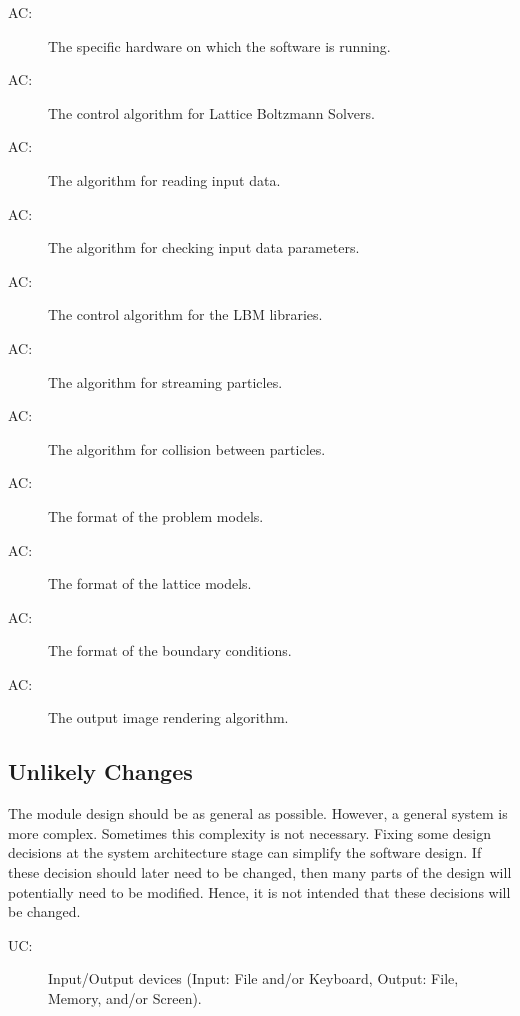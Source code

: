 \documentclass[12pt, titlepage]{article}
\newcounter{acnum}
\newcommand{\actheacnum}{AC\theacnum}
\newcounter{ucnum}
\newcommand{\uctheucnum}{UC\theucnum}
\newcommand{\famname}{Lattice Boltzmann Solvers} %
\begin{document}
\begin{description}
\item[ \actheacnum \label{acHardware}:] The specific
  hardware on which the software is running.
\item[ \actheacnum \label{acCA}:] The control algorithm  for \famname.  
\item[ \actheacnum \label{acInput}:] The algorithm for reading input data.
\item[ \actheacnum \label{acInputParameters}:] The algorithm for checking input data parameters.
\item[ \actheacnum \label{acLBM}:] The control algorithm for the LBM libraries.  
\item[ \actheacnum \label{acStreaming}:] The algorithm for streaming particles. 
\item[ \actheacnum \label{acCollision}:] The algorithm for collision between particles. 
\item[ \actheacnum \label{acProblemFormat}:] The format of the problem models.
\item[ \actheacnum \label{acModels}:] The format of the lattice models.
\item[ \actheacnum \label{acBoundary}:] The format of the boundary conditions.
\item[ \actheacnum \label{acOutput}:] The output image rendering algorithm. 
\end{description}

\subsection{Unlikely Changes} \label{SecUchange}

The module design should be as general as possible. However, a general system is
more complex. Sometimes this complexity is not necessary. Fixing some design
decisions at the system architecture stage can simplify the software design. If
these decision should later need to be changed, then many parts of the design
will potentially need to be modified. Hence, it is not intended that these
decisions will be changed.

\begin{description}
\item[ \uctheucnum \label{ucIO}:] Input/Output devices
  (Input: File and/or Keyboard, Output: File, Memory, and/or Screen).
\end{description}
\end{document}
